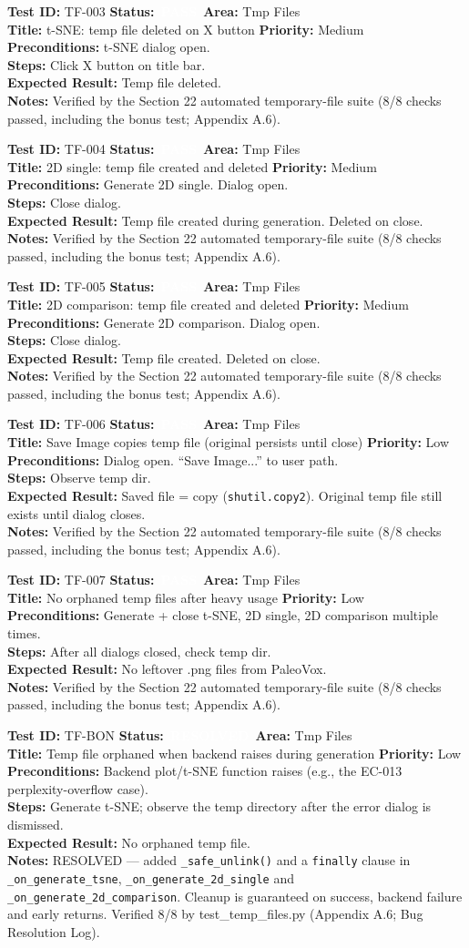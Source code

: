 \documentclass[12pt,a4paper]{article}
\newcommand{\statuspass}{\colorbox{statusgreen}{\textcolor{white}{\textbf{\,PASS\,}}}}
\newcommand{\statusresolved}{\colorbox{statusorange}{\textcolor{white}{\textbf{\,RESOLVED\,}}}}
\newcommand{\testcase}[9]{%
  \smallskip
  \noindent\textbf{Test ID:} #1 \hfill \textbf{Status:} #2 \hfill \textbf{Area:} #3 \\
  \textbf{Title:} #4 \hfill \textbf{Priority:} #5 \\[0.3em]
  \textbf{Preconditions:} #6 \\[0.3em]
  \textbf{Steps:} #7 \\[0.3em]
  \textbf{Expected Result:} #8 \\
  \textbf{Notes:} #9
  \smallskip
}
\begin{document}
\testcase{TF-003}{\statuspass}{Tmp Files}{t-SNE: temp file deleted on X button}{Medium}{t-SNE dialog open.}{Click X button on title bar.}{Temp file deleted.}{Verified by the Section 22 automated temporary-file suite (8/8 checks passed, including the bonus test; Appendix A.6).}


\testcase{TF-004}{\statuspass}{Tmp Files}{2D single: temp file created and deleted}{Medium}{Generate 2D single. Dialog open.}{Close dialog.}{Temp file created during generation. Deleted on close.}{Verified by the Section 22 automated temporary-file suite (8/8 checks passed, including the bonus test; Appendix A.6).}


\testcase{TF-005}{\statuspass}{Tmp Files}{2D comparison: temp file created and deleted}{Medium}{Generate 2D comparison. Dialog open.}{Close dialog.}{Temp file created. Deleted on close.}{Verified by the Section 22 automated temporary-file suite (8/8 checks passed, including the bonus test; Appendix A.6).}


\testcase{TF-006}{\statuspass}{Tmp Files}{Save Image copies temp file (original persists until close)}{Low}{Dialog open. ``Save Image...'' to user path.}{Observe temp dir.}{Saved file = copy (\texttt{shutil.copy2}). Original temp file still exists until dialog closes.}{Verified by the Section 22 automated temporary-file suite (8/8 checks passed, including the bonus test; Appendix A.6).}


\testcase{TF-007}{\statuspass}{Tmp Files}{No orphaned temp files after heavy usage}{Low}{Generate + close t-SNE, 2D single, 2D comparison multiple times.}{After all dialogs closed, check temp dir.}{No leftover .png files from PaleoVox.}{Verified by the Section 22 automated temporary-file suite (8/8 checks passed, including the bonus test; Appendix A.6).}


\testcase{TF-BON}{\statusresolved}{Tmp Files}{Temp file orphaned when backend raises during generation}{Low}{Backend plot/t-SNE function raises (e.g., the EC-013 perplexity-overflow case).}{Generate t-SNE; observe the temp directory after the error dialog is dismissed.}{No orphaned temp file.}{RESOLVED --- added \texttt{\_safe\_unlink()} and a \texttt{finally} clause in \texttt{\_on\_generate\_tsne}, \texttt{\_on\_generate\_2d\_single} and \texttt{\_on\_generate\_2d\_comparison}. Cleanup is guaranteed on success, backend failure and early returns. Verified 8/8 by test\_temp\_files.py (Appendix A.6; Bug Resolution Log).}



\end{document}
